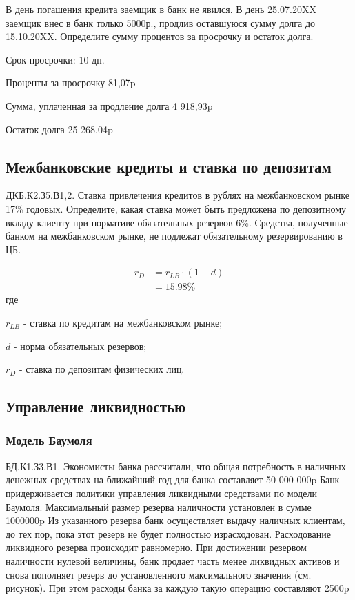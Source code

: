 \documentclass[12pt, table, a4paper,twoside]{exam}
\begin{document}
\begin{questions}
\begin{subparts}
\vfill\null\pagebreak
	\subpart[5] В день погашения кредита заемщик в банк не явился. В день 25.07.20XX заемщик внес в банк только 5000р., продлив оставшуюся сумму долга до 15.10.20XX.  Определите сумму процентов за просрочку и остаток долга.
	\begin{solution}[12em]
		Срок просрочки: 10 дн.
		
		Проценты за просрочку 81,07p
		
		Сумма, уплаченная за продление долга 4 918,93p 
		
		Остаток долга 25 268,04p
	\end{solution}
	
\end{subparts}
\addpoints

\subsection{Межбанковские кредиты и ставка по депозитам}
\question[10] ДКБ.К2.З5.В1,2. Ставка привлечения кредитов в рублях на межбанковском рынке 17\% годовых. Определите, какая ставка может быть предложена по депозитному вкладу клиенту при нормативе обязательных резервов 6\%. Средства, полученные банком на межбанковском рынке, не подлежат обязательному резервированию в ЦБ.
\begin{solution}[10em]
	\begin{align}
	r_D&=r_{LB} \cdot (1-d)\\
	&=15.98\%\nonumber
	\end{align}
	где
	
	$r_{LB}$ - ставка по кредитам на межбанковском рынке;
	
	$d$ - норма обязательных резервов;
	
	$r_D$ - ставка по депозитам физических лиц.
	
\end{solution}


\vfill\null\pagebreak
\subsection{Управление ликвидностью}
\subsubsection{Модель Баумоля}
\question[20] БД.К1.З3.В1. Экономисты банка рассчитали, что общая потребность в наличных денежных средствах на ближайший год для банка составляет 50 000 000p Банк придерживается политики управления ликвидными средствами по модели Баумоля. Максимальный размер резерва наличности установлен в сумме 1000000p Из указанного резерва банк осуществляет выдачу наличных клиентам, до тех пор, пока этот резерв не будет полностью израсходован. Расходование ликвидного резерва происходит равномерно. При достижении резервом наличности нулевой величины, банк продает часть менее ликвидных активов и снова пополняет резерв до установленного максимального значения (см. рисунок). При этом расходы банка за каждую такую операцию составляют 2500p


\end{questions}
\end{document}
